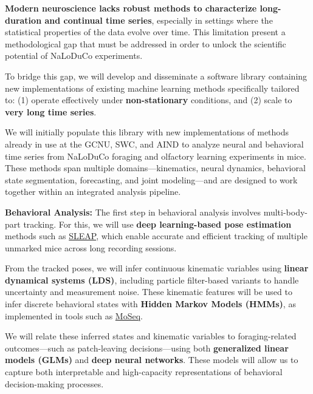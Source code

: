 

\textbf{Modern neuroscience lacks robust methods to characterize long-duration
and continual time series}, especially in settings where the statistical
properties of the data evolve over time. This limitation present a
methodological gap that must be addressed in order to unlock the scientific
potential of NaLoDuCo experiments.

To bridge this gap, we will develop and disseminate a software library
containing new implementations of existing machine learning methods
specifically tailored to: (1) operate effectively under \textbf{non-stationary}
conditions, and (2) scale to \textbf{very long time series}.

\label{sec:initialListOfMethods}

We will initially populate this library with new implementations of methods
already in use at the GCNU, SWC, and AIND to analyze neural and behavioral time
series from NaLoDuCo foraging and olfactory learning experiments in mice. These
methods span multiple domains—kinematics, neural dynamics, behavioral state
segmentation, forecasting, and joint modeling—and are designed to work together
within an integrated analysis pipeline.

\vspace{1em}
\noindent\textbf{Behavioral Analysis:}  
The first step in behavioral analysis involves multi-body-part tracking. For
this, we will use \textbf{deep learning-based pose estimation} methods such as
\href{https://github.com/talmolab/sleap}{SLEAP}, which enable accurate and
efficient tracking of multiple unmarked mice across long recording sessions.

From the tracked poses, we will infer continuous kinematic variables using
\textbf{linear dynamical systems (LDS)}, including particle filter-based
variants to handle uncertainty and measurement noise. These kinematic features
will be used to infer discrete behavioral states with \textbf{Hidden Markov
Models (HMMs)}, as implemented in tools such as
\href{https://dattalab.github.io/moseq2-website/index.html}{MoSeq}.

We will relate these inferred states and kinematic variables to
foraging-related outcomes—such as patch-leaving decisions—using both
\textbf{generalized linear models (GLMs)} and \textbf{deep neural networks}.
These models will allow us to capture both interpretable and high-capacity
representations of behavioral decision-making processes.

